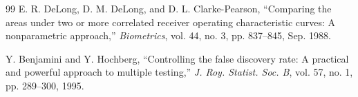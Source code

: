 \documentclass[conference]{IEEEtran}
\begin{document}
\begin{thebibliography}{99}
 E. R. DeLong, D. M. DeLong, and D. L. Clarke-Pearson, ``Comparing the areas under two or more correlated receiver operating characteristic curves: A nonparametric approach,'' \emph{Biometrics}, vol. 44, no. 3, pp. 837--845, Sep. 1988.

 Y. Benjamini and Y. Hochberg, ``Controlling the false discovery rate: A practical and powerful approach to multiple testing,'' \emph{J. Roy. Statist. Soc. B}, vol. 57, no. 1, pp. 289--300, 1995.

\end{thebibliography}
\end{document}

